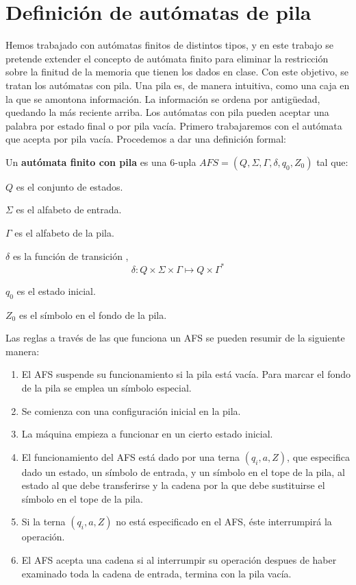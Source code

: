 \chapter{Definición de autómatas de pila}

Hemos trabajado con autómatas finitos de distintos tipos, y en este trabajo se pretende extender el concepto de autómata finito para eliminar la restricción sobre la finitud de la memoria que tienen los dados en clase. Con este objetivo, se tratan los autómatas con pila. Una pila es, de manera intuitiva, como una caja en la que se amontona información. La información se ordena por antigüedad, quedando la más reciente arriba. Los autómatas con pila pueden aceptar una palabra por estado final o por pila vacía. Primero trabajaremos con el autómata que acepta por pila vacía. Procedemos a dar una definición formal:

\begin{Def}
Un \textbf{autómata finito con pila} es una $6$-upla $AFS=(Q,\Sigma,\Gamma, \delta , q_0, Z_0)$ tal que:
\begin{itemize*}
\item $Q$ es el conjunto de estados.
\item $\Sigma$ es el alfabeto  de entrada.
\item $\Gamma $ es el alfabeto de la pila.
\item $\delta $ es la función de transición ,
$$\delta : Q \times \Sigma \times \Gamma \mapsto Q\times \Gamma^* $$
\item $q_0$ es el estado inicial.
\item $Z_0$ es el símbolo en el fondo de la pila.
\end{itemize*}
\end{Def}

\vspace{5mm}

Las reglas a través de las que funciona un AFS se pueden resumir de la siguiente manera:

\begin{enumerate}
\item El AFS suspende su funcionamiento si la pila está vacía. Para marcar el fondo de la pila se emplea un símbolo especial.
\item Se comienza con una configuración inicial en la pila. 
\item La máquina empieza a funcionar en un cierto estado inicial. 
\item El funcionamiento del AFS está dado por una terna $(q_i,a,Z)$, que especifica dado un estado, un símbolo de entrada, y un símbolo en el tope de la pila, al estado al que debe transferirse y la cadena por la que debe sustituirse el símbolo en el tope de la pila. 
\item Si la terna $(q_i,a,Z)$ no está especificado en el AFS, éste interrumpirá la operación. 
\item El AFS acepta una cadena si al interrumpir su operación despues de haber examinado toda la cadena de entrada, termina con la pila vacía. 
\end{enumerate}

